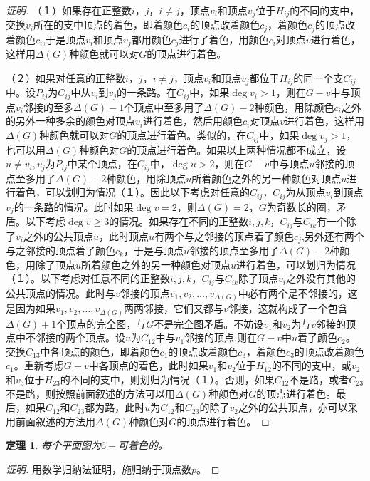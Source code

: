 \documentclass{book}[oneside]
\newtheorem{Thm}{定理}[chapter]
\begin{document}
\begin{CJK*}{UTF8}{gbsn}
\begin{proof}[证明]
   （１）如果存在正整数$i$，$j$，$i\neq j$，顶点$v_i$和顶点$v_j$位于$H_{ij}$的不同的支中，交换$v_i$所在的支中顶点的着色，即着颜色$c_i$的顶点改着颜色$c_j$，着颜色$c_j$的顶点改着颜色$c_i$,于是顶点$v_i$和顶点$v_j$都用颜色$c_j$进行了着色，用颜色$c_i$对顶点$v$进行着色，这样用$\Delta(G)$种颜色就可以对$G$的顶点进行着色。

   （２）如果对任意的正整数$i$，$j$，$i\neq j$，顶点$v_i$和顶点$v_j$都位于$H_{ij}$的同一个支$C_{ij}$中。设$P_{ij}$为$C_{ij}$中从$v_i$到$v_j$的一条路。在$C_{ij}$中，如果$\deg v_i>1$，则在$G-v$中与顶点$v_i$邻接的至多$\Delta(G)-1$个顶点中至多用了$\Delta(G)-2$种颜色，用除颜色$c_i$之外的另外一种多余的颜色对顶点$v_i$进行着色，然后用颜色$c_i$对顶点$v$进行着色，这样用$\Delta(G)$种颜色就可以对$G$的顶点进行着色。类似的，在$C_{ij}$中，如果$\deg v_j>1$，也可以用$\Delta(G)$种颜色对$G$的顶点进行着色。如果以上两种情况都不成立，设$u\neq v_i,v_j$为$P_{ij}$中某个顶点，在$C_{ij}$中，$\deg u>2$，则在$G-v$中与顶点$u$邻接的顶点至多用了$\Delta(G)-2$种颜色，用除顶点$u$所着颜色之外的另一种颜色对顶点$u$进行着色，可以划归为情况（１）。因此以下考虑对任意的$C_{ij}$，$C_{ij}$为从顶点$v_i$到顶点$v_j$的一条路的情况。此时如果$\deg v=2$，则$\Delta(G)=2$，$G$为奇数长的圈，矛盾。以下考虑$\deg v\geq 3$的情况。如果存在不同的正整数$i,j,k$，$C_{ij}$与$C_{ik}$有一个除了$v_i$之外的公共顶点$u$，此时顶点$u$有两个与之邻接的顶点着了颜色$c_j$,另外还有两个与之邻接的顶点着了颜色$c_k$，于是与顶点$u$邻接的顶点至多用了$\Delta(G)-2$种颜色，用除了顶点$u$所着颜色之外的另一种颜色对顶点$u$进行着色，可以划归为情况（１）。以下考虑对任意不同的正整数$i,j,k$，$C_{ij}$与$C_{ik}$除了顶点$v_i$之外没有其他的公共顶点的情况。此时与$v$邻接的顶点$v_1,v_2,\ldots,v_{\Delta(G)}$中必有两个是不邻接的，这是因为如果$v_1,v_2,\ldots,v_{\Delta(G)}$两两邻接，它们又都与$v$邻接，这就构成了一个包含$\Delta(G)+1$个顶点的完全图，与$G$不是完全图矛盾。不妨设$v_1$和$v_2$为与$v$邻接的顶点中不邻接的两个顶点。设$u$为$C_{12}$中与$v_1$邻接的顶点,则在$G-v$中$u$着了颜色$c_2$。交换$C_{13}$中各顶点的颜色，即着颜色$c_1$的顶点改着颜色$c_3$，着颜色$c_3$的顶点改着颜色$c_1$。重新考虑$G-v$中各顶点的着色，此时如果$v_1$和$v_2$位于$H_{12}$的不同的支中，或$v_2$和$v_3$位于$H_{23}$的不同的支中，则划归为情况（１）。否则，如果$C_{12}$不是路，或者$C_{23}$不是路，则按照前面叙述的方法可以用$\Delta(G)$种颜色对$G$的顶点进行着色。最后，如果$C_{12}$和$C_{23}$都为路，此时$u$为$C_{12}$和$C_{23}$的除了$v_2$之外的公共顶点，亦可以采用前面叙述的方法用$\Delta(G)$种颜色对$G$的顶点进行着色。

   
   
  \end{proof}
  \begin{Thm}
    每个平面图为$6-$可着色的。
  \end{Thm}
   \begin{proof}[证明]
   用数学归纳法证明，施归纳于顶点数$p$。


\end{proof}
\end{CJK*}
\end{document}
